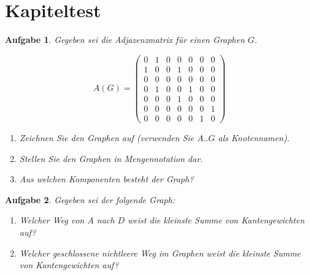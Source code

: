 \documentclass[12pt,a4paper]{report}
\theoremstyle{break}
\newtheorem{exercise}{Aufgabe}[chapter]
\theoremstyle{plain}
\begin{document}
\section{Kapiteltest}\label{graphchaptest}

\begin{exercise}\label{test1adjacency}
Gegeben sei die Adjazenzmatrix f\"{u}r einen Graphen $G$.

\begin{displaymath}
A(G) = \left(
\begin{array}{ccccccc}
0 & 1 & 0 & 0 & 0 & 0 & 0 \\
1 & 0 & 0 & 1 & 0 & 0 & 0 \\
0 & 0 & 0 & 0 & 0 & 0 & 0 \\
0 & 1 & 0 & 0 & 1 & 0 & 0 \\
0 & 0 & 0 & 1 & 0 & 0 & 0 \\
0 & 0 & 0 & 0 & 0 & 0 & 1 \\
0 & 0 & 0 & 0 & 0 & 1 & 0 
\end{array}
\right)
\end{displaymath}

\begin{enumerate}
\item Zeichnen Sie den Graphen auf (verwenden Sie $A..G$ als
  Knotennamen).
\item Stellen Sie den Graphen in Mengennotation dar.
\item Aus welchen Komponenten besteht der Graph?
\end{enumerate}

\end{exercise}

\begin{exercise}\label{test1weights}
Gegeben sei der folgende Graph:


\begin{enumerate}
\item Welcher Weg von $A$ nach $D$ weist die kleinste Summe von
  Kantengewichten auf?
\item Welcher geschlossene nichtleere Weg im Graphen weist die kleinste Summe von
  Kantengewichten auf?
\end{enumerate}

\end{exercise}
\end{document}
